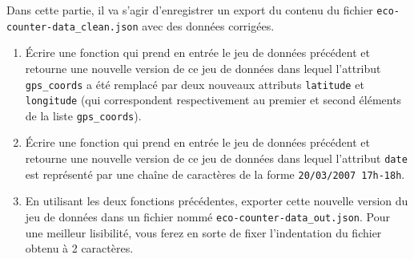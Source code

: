 \documentclass[11pt,a4paper]{article}
\begin{document}
Dans cette partie, il va s'agir d'enregistrer un export du contenu du fichier \verb+eco-counter-data_clean.json+ avec des données corrigées.

\begin{enumerate}
    \item Écrire une fonction qui prend en entrée le jeu de données précédent et retourne une nouvelle version de ce jeu de données dans lequel l'attribut \verb+gps_coords+ a été remplacé par deux nouveaux attributs \verb+latitude+ et \verb+longitude+ (qui correspondent respectivement au premier et second éléments de la liste \verb+gps_coords+).
    
    \item Écrire une fonction qui prend en entrée le jeu de données précédent et retourne une nouvelle version de ce jeu de données dans lequel l'attribut \verb+date+ est représenté par une chaîne de caractères de la forme \verb+20/03/2007 17h-18h+.
    
    \item En utilisant les deux fonctions précédentes, exporter cette nouvelle version du jeu de données dans un fichier nommé \verb+eco-counter-data_out.json+. Pour une meilleur lisibilité, vous ferez en sorte de fixer l'indentation du fichier obtenu à 2 caractères.
\end{enumerate}
\end{document}
